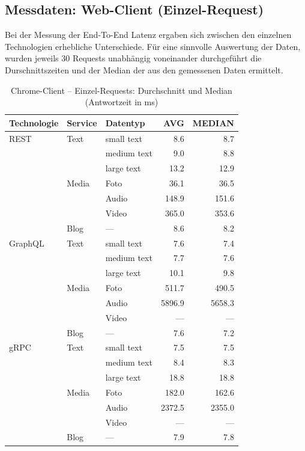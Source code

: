 \clearpage
\subsection*{Messdaten: Web-Client (Einzel-Request)}

Bei der Messung der End-To-End Latenz ergaben sich zwischen den einzelnen Technologien erhebliche Unterschiede. 
Für eine sinnvolle Auswertung der Daten, wurden jeweils 30 Requests unabhängig voneinander durchgeführt die Durschnittszeiten und der Median der aus den gemessenen Daten ermittelt. 

\begin{table}[h]
	\centering
	\caption{Chrome-Client – Einzel-Requests: Durchschnitt und Median (Antwortzeit in ms)}
	\label{tab:chrome-single-avg}
	\renewcommand{\arraystretch}{1.1}
	\begin{tabular}{|l|l|l|r|r|}
		\hline
		\textbf{Technologie} & \textbf{Service} & \textbf{Datentyp} & \textbf{AVG} & \textbf{MEDIAN} \\
		\hline
		REST & Text  & small text  & 8.6 & 8.7 \\
		&       & medium text & 9.0 & 8.8 \\
		&       & large text  & 13.2 & 12.9 \\
		& Media & Foto        & 36.1 & 36.5 \\
		&       & Audio       & 148.9 & 151.6 \\
		&       & Video       & 365.0 & 353.6 \\
		& Blog  & —           & 8.6 & 8.2 \\
		\hline
		GraphQL & Text  & small text  & 7.6 & 7.4 \\
		&       & medium text & 7.7 & 7.6 \\
		&       & large text  & 10.1 & 9.8 \\
		& Media & Foto        & 511.7 & 490.5 \\
		&       & Audio       & 5896.9 & 5658.3 \\
		&       & Video       & — & — \\
		& Blog  & —           & 7.6 & 7.2 \\
		\hline
		gRPC & Text  & small text  & 7.5 & 7.5 \\
		&       & medium text & 8.4 & 8.3 \\
		&       & large text  & 18.8 & 18.8 \\
		& Media & Foto        & 182.0 & 162.6 \\
		&       & Audio       & 2372.5 & 2355.0 \\
		&       & Video       & — & — \\
		& Blog  & —           & 7.9 & 7.8 \\
		\hline
	\end{tabular}
\end{table}

